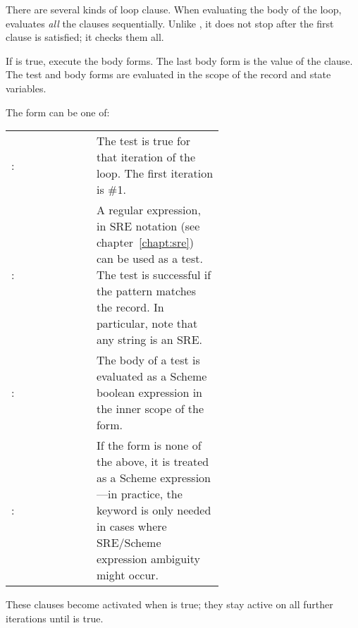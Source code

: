 \begin{code}
There are several kinds of loop clause. When evaluating the body of the
loop,  evaluates \emph{all} the clauses sequentially. 
Unlike , it does not stop after the first clause is satisfied; 
it checks them all.

\begin{itemize}

        If  is true, execute the body forms. The last body form
        is the value of the clause. The test and body forms are evaluated
        in the scope of the record and state variables.

        The  form can be one of:
        \begin{inset}
        \begin{tabular}{lp{0.6\linewidth}}
          \var{integer}: &      The test is true for that iteration of the loop.
                        The first iteration is \#1. \\
    
          \var{sre}: &  A regular expression, in SRE notation 
                        (see chapter~\ref{chapt:sre}) can be used as
                        a test. The test is successful if the pattern
                        matches the record.
                        In particular, note that any string is an SRE. \\
    
          \ex{(when \var{expr})}: &
                        The body of a \ex{when} test is evaluated as a
                        Scheme boolean expression in the inner scope of the
                        \ex{awk} form. \\

          \var{expr}: & If the form is none of the above, it is treated as
                        a Scheme expression---in practice, the \ex{when}
                        keyword is only needed in cases where SRE/Scheme
                        expression ambiguity might occur.
        \end{tabular}
        \end{inset}


%
        These clauses become activated when  is true; 
        they stay active on all further iterations until 
        is true.


\end{itemize}
\end{code}
